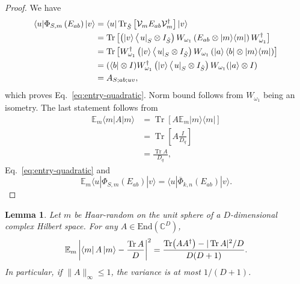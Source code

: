 \documentclass[10pt,twocolumn,superscriptaddress,aps,amsmath,amssymb,citeautoscript,floatfix,prx]{revtex4-2}
\theoremstyle{plain}
\theoremstyle{plain}
\theoremstyle{plain}
\theoremstyle{plain}
\theoremstyle{plain}
\theoremstyle{plain}
\newcommand{\C}{\mathbb{C}}
\newcommand{\End}{\mathrm{End}}
\theoremstyle{plain}
\newtheorem{smlemma}[smtheorem]{Lemma}
\theoremstyle{definition}
\theoremstyle{plain}
\begin{document}
\begin{appendix}
\begin{proof}
We have
\begin{align*}
\langle u| \Phi_{S, m}\left(E_{a b}\right)|v\rangle&=\langle u|\operatorname{Tr}_{\hat S}\left[\mathcal{V}_m E_{a b} \mathcal{V}_m^{\dagger}\right]|v\rangle\\
&=\operatorname{Tr}\left[\left(|v\rangle\left\langle\left. u\right|_S \otimes I_{\hat S}\right) W_{\omega_1}\left(E_{a b} \otimes|m\rangle\langle m|\right) W_{\omega_1}^{\dagger}\right]\right.\\
&=\operatorname{Tr}\left[W_{\omega_1}^{\dagger}\left(|v\rangle\left\langle\left. u\right|_S \otimes I_{\hat S}\right) W_{\omega_1}\left(\ket{a}\bra{b} \otimes|m\rangle\langle m|\right)\right]\right.\\
&=(\langle b| \otimes I) W_{\omega_1}^{\dagger}\left(|v\rangle\left\langle\left. u\right|_S \otimes I_{\hat S}\right) W_{\omega_1}(|a\rangle \otimes I)\right.\\
&=A_{S ; a b ; u v},
\end{align*}
which proves Eq.~\eqref{eq:entry-quadratic}. Norm bound follows from $W_{\omega_1}$ being an isometry. The last statement follows from
\[
    \begin{aligned}
\mathbb{E}_m\langle m| A|m\rangle & =\operatorname{Tr}\left[A \mathbb{E}_m|m\rangle\langle m|\right] \\
& =\operatorname{Tr}\left[A \frac{I}{D_q}\right] \\
& =\frac{\operatorname{Tr} A}{D_q},
\end{aligned}
\]
Eq.~\eqref{eq:entry-quadratic} and 
\[
\mathbb{E}_m\langle u| \Phi_{S, m}\left(E_{a b}\right)|v\rangle=\langle u| \overline{\Phi}_{k,n}\left(E_{a b}\right)|v\rangle.
\]
\end{proof}

\begin{smlemma}
\label{lem:haar-second-moment}
Let $m$ be Haar-random on the unit sphere of a $D$-dimensional complex Hilbert space. For any $A\in\End(\C^D)$,
\begin{equation}
\label{eq:haar-variance}
  \mathbb{E}_m\left|
  \bra mA\ket m-\frac{\Tr A}{D}
  \right|^2
  =\frac{\Tr(AA^\dagger)-|\Tr A|^2/D}{D(D+1)}.
\end{equation}
In particular, if $\|A\|_\infty\le1$, the variance is at most $1/(D+1)$.
\end{smlemma}


\end{appendix}
\end{document}
